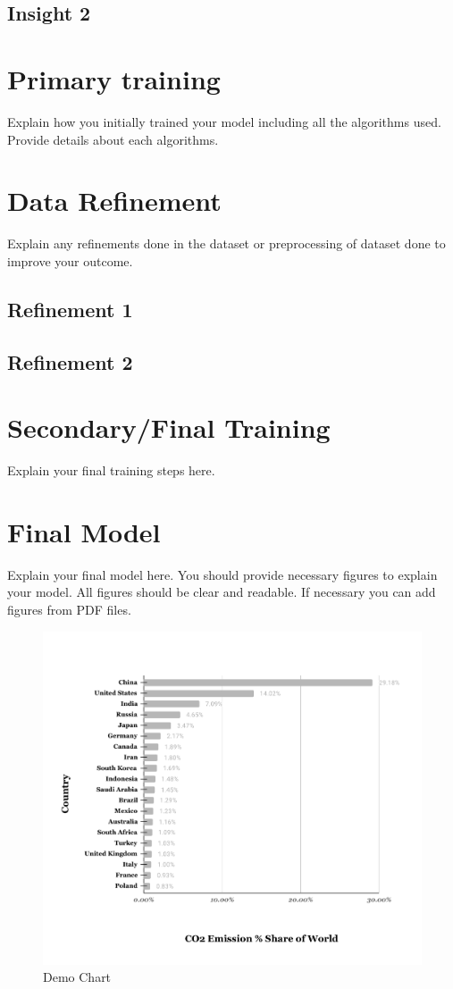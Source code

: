 \subsection{Insight 2}

\section{Primary training}
Explain how you initially trained your model including all the algorithms used. Provide details about each algorithms.



\section{Data Refinement}
Explain any refinements done in the dataset or preprocessing of dataset done to improve your outcome.


\subsection{Refinement 1}

\subsection{Refinement 2} 


\newpage


\section{Secondary/Final Training}
Explain your final training steps here.

\section{Final Model}
Explain your final model here. You should provide necessary figures to explain your model. All figures should be clear and readable. If necessary you can add figures from PDF files. 

\begin{figure}[h]
    \centering
    \includegraphics[width=.75\textwidth]{figures/demoFigure3.pdf}
    \caption{Demo Chart}
    \label{fig:dataChart}
\end{figure}



